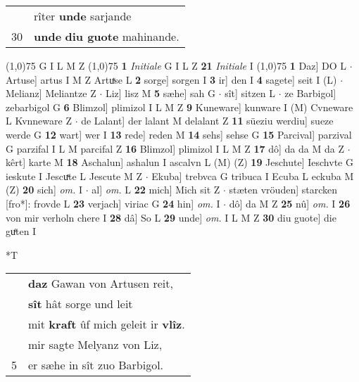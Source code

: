 \documentclass[8pt,a4paper,notitlepage]{article}
\begin{document}
\begin{table}[ht]
\begin{minipage}[t]{0.5\linewidth}
\begin{tabular}{rl}
 & rîter \textbf{unde} sarjande\\ 
30 & \textbf{unde} \textbf{diu guote} mahinande.\\ 
\end{tabular}
\scriptsize
\line(1,0){75} \newline
G I L M Z \newline
\line(1,0){75} \newline
\textbf{1} \textit{Initiale} G I L Z  \textbf{21} \textit{Initiale} I  \newline
\line(1,0){75} \newline
\textbf{1} Daz] DO L  $\cdot$ Artuse] artus I M Z Artuͯse L \textbf{2} sorge] sorgen I \textbf{3} ir] den I \textbf{4} sagete] seit I (L)  $\cdot$ Melianz] Meliantze Z  $\cdot$ Liz] lisz M \textbf{5} sæhe] sah G  $\cdot$ sît] sitzen L  $\cdot$ ze Barbigol] zebarbigol G \textbf{6} Blimzol] plimizol I L M Z \textbf{9} Kuneware] kunware I (M) Cvneware L Kvnneware Z  $\cdot$ de Lalant] der lalant M delalant Z \textbf{11} süeziu werdiu] sueze werde G \textbf{12} wart] wer I \textbf{13} rede] reden M \textbf{14} sehs] sehse G \textbf{15} Parcival] parzival G parzifal I L M parcifal Z \textbf{16} Blimzol] plimizol I L M Z \textbf{17} dô] da da M da Z  $\cdot$ kêrt] karte M \textbf{18} Aschalun] ashalun I ascalvn L (M) (Z) \textbf{19} Jeschute] Ieschvte G ieskute I Jescuͯte L Jescute M Z  $\cdot$ Ekuba] trebvca G tribuca I Ecuba L eckuba M (Z) \textbf{20} sich] \textit{om.} I  $\cdot$ al] \textit{om.} L \textbf{22} mich] Mich sit Z  $\cdot$ stæten vröuden] starcken [fro*]: frovde L \textbf{23} verjach] viriac G \textbf{24} hin] \textit{om.} I  $\cdot$ dô] da M Z \textbf{25} nû] \textit{om.} I \textbf{26} von mir verholn chere I \textbf{28} dâ] So L \textbf{29} unde] \textit{om.} I L M Z \textbf{30} diu guote] die guͤten I \newline
\end{minipage}
\hspace{0.5cm}
\begin{minipage}[t]{0.5\linewidth}
\small
\begin{center}*T
\end{center}
\begin{tabular}{rl}
 & \textbf{daz} Gawan von Artusen reit,\\ 
 & \textbf{sît} hât sorge und leit\\ 
 & mit \textbf{kraft} ûf mich geleit ir \textbf{vlîz}.\\ 
 & mir sagte Melyanz von Liz,\\ 
5 & er sæhe in sît zuo Barbigol.\\ 

\end{tabular}
\end{minipage}
\end{table}
\end{document}
